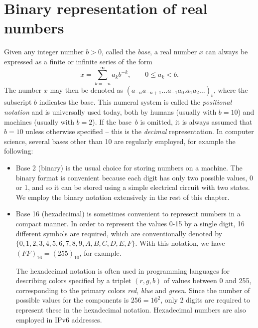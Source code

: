 \section{Binary representation of real numbers}%
\label{sec:binary_representation_of_real_numbers}

Given any integer number $b > 0$, called the \emph{base},
a real number $x$ can always be expressed as a finite or infinite series of the form
\begin{equation}
    \label{eq:base_representation}
    x = \sum_{k=-n}^{\infty} a_k b^{-k}, \qquad 0 \leq a_k < b.
\end{equation}
The number $x$ may then be denoted as $(a_{-n} a_{-n+1}\dots a_{-1} a_{0}.a_{1} a_{2} \dots)_{b}$,
where the subscript $b$ indicates the base.
This numeral system is called the \emph{positional notation} and is universally used today,
both by humans (usually with $b=10$) and machines (usually with $b=2$).
If the base~$b$ is omitted,
it is always assumed that $b = 10$ unless otherwise specified
-- this is the \emph{decimal} representation.
In computer science, several bases other than 10 are regularly employed,
for example the following:
\begin{itemize}
    \item
        Base 2 (binary) is the usual choice for storing numbers on a machine.
        The binary format is convenient because each digit has only two possible values, 0 or 1,
        and so it can be stored using a simple electrical circuit with two states.
        We employ the binary notation extensively in the rest of this chapter.

    \item
        Base 16 (hexadecimal) is sometimes convenient to represent numbers in a compact manner.
        In order to represent the values 0-15 by a single digit,
        16 different symbols are required, which are conventionally denoted by $\{0,1,2,3,4,5,6,7,8,9,A,B,C,D,E,F\}$.
        With this notation, we have $(FF)_{16} = (255)_{10}$, for example.

        The hexadecimal notation is often used in programming languages for describing colors specified by a triplet $(r,g,b)$ of values between 0 and 255,
        corresponding to the primary colors \emph{red}, \emph{blue} and \emph{green}.
        Since the number of possible values for the components is $256 = 16^2$,
        only 2 digits are required to represent these in the hexadecimal notation.
        Hexadecimal numbers are also employed in IPv6 addresses.
\end{itemize}

